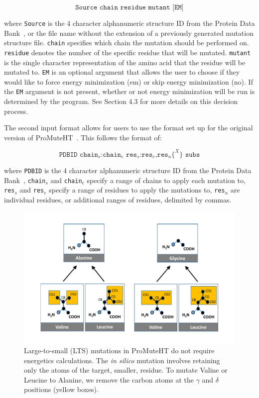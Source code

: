 \documentclass[sigconf]{acmart}
\begin{document}
$$\texttt{Source chain residue mutant [EM]}$$ 

\noindent where \texttt{Source} is the 4 character alphanumeric structure ID from the Protein Data Bank~\cite{bernstein1977}, or the file name without the extension of a previously generated mutation structure file. \texttt{chain} specifies which chain the mutation should be performed on.  \texttt{residue} denotes the number of the specific residue that will be mutated. \texttt{mutant} is the single character representation of the amino acid that the residue will be mutated to.  \texttt{EM} is an optional argument that allows the user to choose if they would like to force energy minimization (em) or skip energy minimization (no).  If the \texttt{EM} argument is not present, whether or not energy minimization will be run is determined by the program.  See Section 4.3 for more details on this decision process.

The second input format allows for users to use the format set up for the original version of ProMuteHT~\cite{andersson2017}.  This follows the format of:

$$\texttt{PDBID chain$_{s}$:chain$_{e}$ res$_{s}$:res$_{e}$,res$_n$${\{^X\}}$ subs}$$ 

\noindent where \texttt{PDBID} is the 4 character alphanumeric structure ID from the Protein Data Bank~\cite{bernstein1977}, \texttt{chain$_{s}$} and \texttt{chain$_{e}$} specify a range of chains to apply each mutation to, \texttt{res$_{s}$} and \texttt{res$_{e}$} specify a range of residues to apply the mutations to, \texttt{res$_{n}$} are individual residues, or additional ranges of residues, delimited by commas. 



\begin{figure}[t]
\includegraphics[width=0.85\columnwidth]{Figures/lts.pdf}
\caption{Large-to-small (LTS) mutations in ProMuteHT do not require energetics calculations. The \textit{in silico} mutation involves retaining only the atoms of the target, smaller, residue. To mutate Valine or Leucine to Alanine, we remove the carbon atoms at the $\gamma$ and $\delta$ positions (yellow boxes).}
\label{LTS}
\end{figure}
\end{document}
